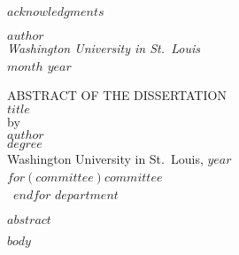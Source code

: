 \documentclass[12pt, oneside, openany]{book}
\begin{document}
$acknowledgments$

\hfill $author$\\
\textit{Washington University in St.~Louis}\\
\textit{$month$ $year$}

\clearpage
{}
\begin{center}
    ABSTRACT OF THE DISSERTATION\\
    $title$\\
    by\\
    $author$\\
    $degree$\\
    Washington University in St.~Louis, $year$\\
    $for(committee)$$committee$~\\~$endfor$ %
    $department$\\
\end{center}
$abstract$

\mainmatter

$body$

\clearpage
\printbibliography[heading=bibintoc]
\end{document}

